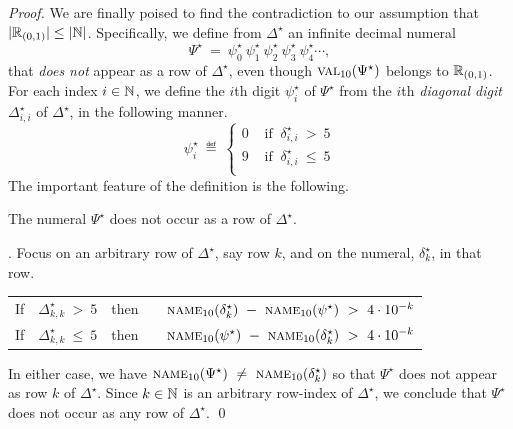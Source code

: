 \begin{proof}
We are finally poised to find the contradiction to our assumption that $|\mathbb{R}_{(0,1)}| \leq |\mathbb{N}|$.  Specifically, we define from $\Delta^\star$ an infinite decimal numeral
\[ \Psi^\star \ = \ \psi^\star_0 \ \psi^\star_1 \ \psi^\star_2 \ \psi^\star_3 \ \psi^\star_4 \cdots, \]
that {\em does not} appear as a row of $\Delta^\star$, even though $\mbox{\sc val}_{10}(\Psi^\star)$ belongs to $\mathbb{R}_{(0,1)}$.  For each index $i \in \mathbb{N}$, we define the $i$th digit $\psi^\star_i$ of $\Psi^\star$ from the $i$th {\em diagonal digit} $\Delta^\star_{i,i}$ of $\Delta^\star$, in the following manner.
\[ \psi^\star_i \ \eqdef \
\left\{
\begin{array}{cc}
0 & \mbox{ if } \ \delta^\star_{i,i} \ > \ 5 \\
9 & \mbox{ if } \ \delta^\star_{i,i} \ \leq \ 5 \\
\end{array}
\right.
\]
The important feature of the definition is the following.
%


\begin{lemma}
\label{lem:PSI-notin-DELTA-num}
The numeral $\Psi^\star$ does not occur as a row of $\Delta^\star$.
\end{lemma}

.
Focus on an arbitrary row of $\Delta^\star$, say row $k$, and on the numeral, $\delta^\star_k$, in that row.

\medskip

\begin{tabular}{lclc}
If & $\Delta^\star_{k,k} \ > \ 5$ & then & \ \
$\mbox{\sc name}_{10}(\delta^\star_k) \ - \ \mbox{\sc name}_{10}(\psi^\star) \ > \ 4 \cdot 10^{-k}$ \\
If & $\Delta^\star_{k,k} \ \leq \ 5$ & then & \ \
$\mbox{\sc name}_{10}(\psi^\star) \ - \ \mbox{\sc name}_{10}(\delta^\star_k) \ > \ 4
\cdot 10^{-k}$
\end{tabular}

\medskip

\noindent
In either case, we have $\mbox{\sc name}_{10}(\Psi^\star) \ \neq \ \mbox{\sc name}_{10}(\delta^\star_k)$ so that $\Psi^\star$ does not appear as row $k$ of $\Delta^\star$.  Since $k \in \mathbb{N}$ is an arbitrary row-index of $\Delta^\star$, we conclude that $\Psi^\star$ does not occur as any row of $\Delta^\star$.  \qed

\medskip


\end{proof}
